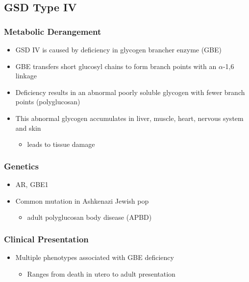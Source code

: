 \documentclass{scrartcl}
\begin{document}
\subsection{GSD Type IV}
\label{sec:org3c9ca7f}
\subsubsection{Metabolic Derangement}
\label{sec:org6db0171}
\begin{itemize}
\item GSD IV is caused by deficiency in glycogen brancher enzyme (GBE)
\item GBE transfers short glucosyl chains to form branch points with an
\(\alpha\)-1,6 linkage
\item Deficiency results in an abnormal poorly soluble glycogen with fewer branch points (polyglucosan)
\item This abnormal glycogen accumulates in liver, muscle, heart, nervous system and skin
\begin{itemize}
\item leads to tissue damage
\end{itemize}
\end{itemize}

\subsubsection{Genetics}
\label{sec:orgf49cfbf}
\begin{itemize}
\item AR, GBE1
\item Common mutation in Ashkenazi Jewish pop
\begin{itemize}
\item adult polyglucosan body disease (APBD)
\end{itemize}
\end{itemize}

\subsubsection{Clinical Presentation}
\label{sec:org9215a89}

\begin{itemize}
\item Multiple phenotypes associated with GBE deficiency
\begin{itemize}
\item Ranges from death in utero to adult presentation
\end{itemize}
\end{itemize}
\end{document}
